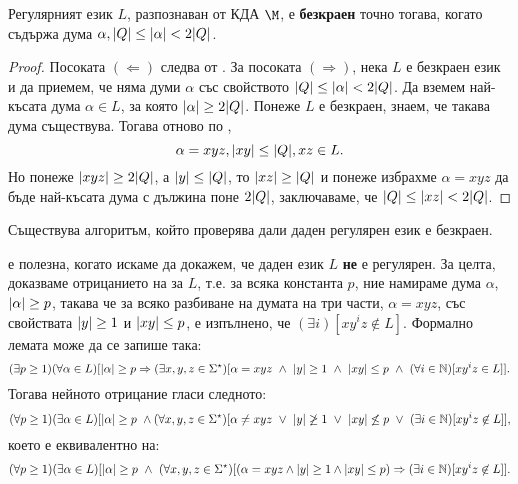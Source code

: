 \begin{prop}
  Регулярният език $L$, 
  разпознаван от КДА $\M$, е {\bf безкраен} точно тогава, когато съдържа дума $\alpha, \vert{Q}\vert \leq \vert{\alpha}\vert < 2\vert{Q}\vert$.
\end{prop}
\begin{proof}
  Посоката $(\Leftarrow)$  следва от .
  За посоката $(\Rightarrow)$, нека $L$ е безкраен език и да приемем, че няма думи $\alpha$ със
  свойството $\vert{Q}\vert \leq \vert{\alpha}\vert <  2\vert{Q}\vert$.
  Да вземем най-късата дума $\alpha \in L$, за която $\vert{\alpha}\vert \geq 2\vert{Q}\vert$.
  Понеже $L$ е безкраен, знаем, че такава дума съществува.
  Тогава отново по ,
  \[\alpha = xyz, \vert{xy}\vert \leq \vert{Q}\vert, xz \in L.\]
  Но понеже $\vert{xyz}\vert \geq 2\vert{Q}\vert$, а $\vert{y}\vert \leq \vert{Q}\vert$, то $\vert{xz}\vert \geq \vert{Q}\vert$ и понеже избрахме $\alpha = xyz$
  да бъде най-късата дума с дължина поне $2\vert{Q}\vert$, заключаваме, че $\vert{Q}\vert \leq \vert{xz}\vert < 2\vert{Q}\vert$.
\end{proof}

\begin{cor}
  Съществува алгоритъм, който проверява дали даден регулярен език е безкраен.
\end{cor}

\begin{framed}
   е полезна, когато искаме да докажем, че даден език $L$ {\bf не} е регулярен.
  За целта, доказваме отрицанието на  за $L$, т.е.
  за всяка константа $p$, ние намираме дума $\alpha$, $\vert{\alpha}\vert\geq p$, такава че за всяко разбиване на думата на три части, $\alpha = xyz$,
  със свойствата $\vert{y}\vert \geq 1$ и $\vert{xy}\vert \leq p$, е изпълнено, че $(\exists i)[xy^iz \not\in L]$.
  Формално лемата може да се запише така:
  {\scriptsize  
    \[(\exists p \geq 1)(\forall \alpha \in L)[\vert{\alpha}\vert \geq p \Rightarrow (\exists x,y,z\in\Sigma^\star)[\alpha = xyz\ \wedge\ \vert{y}\vert \geq 1\ \wedge\ \vert{xy}\vert \leq p\ \wedge\ (\forall i\in\mathbb{N})[xy^iz \in L]].\]}
  Тогава нейното отрицание гласи следното:
  {\scriptsize  \[(\forall p \geq 1)(\exists \alpha \in L)[\abs{\alpha} \geq p\ \wedge (\forall x,y,z\in\Sigma^\star)[\alpha \neq xyz\ \vee\ \abs{y} \not\geq 1\ \vee\ \abs{xy} \not\leq p\ \vee\ (\exists i\in\Nat)[xy^iz \not\in L]],\]}
  което е еквивалентно на:
  {\scriptsize
    \[(\forall p \geq 1)(\exists \alpha \in L)[\vert{\alpha}\vert \geq p\ \wedge\ (\forall x,y,z\in\Sigma^\star)[(\alpha = xyz \wedge \vert{y}\vert \geq 1\wedge \vert{xy}\vert \leq p) \Rightarrow (\exists i\in\mathbb{N})[xy^iz \not\in L]].\]}
\end{framed}

